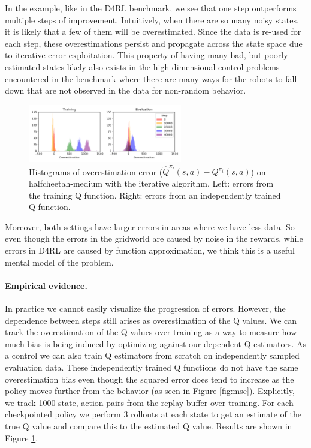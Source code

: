 In the example, like in the D4RL benchmark, we see that one step outperforms multiple steps of improvement. Intuitively, when there are so many noisy states, it is likely that a few of them will be overestimated. Since the data is re-used for each step, these overestimations persist and propagate across the state space due to iterative error exploitation. This property of having many bad, but poorly estimated states likely also exists in the high-dimensional control problems encountered in the benchmark where there are many ways for the robots to fall down that are not observed in the data for non-random behavior.
\begin{figure}[h]
\vspace{-0.5cm}
    \centering
    \includegraphics[width=0.6\textwidth]{figures/offline-rl/estimation/histograms.png}
    \caption{Histograms of overestimation error ($\widehat Q^{\pi_i}(s,a) - Q^{\pi_i}(s,a)$) on halfcheetah-medium with the iterative algorithm. Left: errors from the training Q function. Right: errors from an independently trained Q function.}
    \label{fig:over}
\end{figure}
Moreover, both settings have larger errors in areas where we have less data.
So even though the errors in the gridworld are caused by noise in the rewards, while errors in D4RL are caused by function approximation, we think this is a useful mental model of the problem.

\paragraph{Empirical evidence.}
In practice we cannot easily visualize the progression of errors. However, the dependence between steps still arises as overestimation of the Q values. We can track the overestimation of the Q values over training as a way to measure how much bias is being induced by optimizing against our dependent Q estimators. As a control we can also train Q estimators from scratch on independently sampled evaluation data. These independently trained Q functions do not have the same overestimation bias even though the squared error does tend to increase as the policy moves further from the behavior (as seen in Figure \ref{fig:mse}).
Explicitly, we track 1000 state, action pairs from the replay buffer over training. For each checkpointed policy we perform 3 rollouts at each state to get an estimate of the true Q value and compare this to the estimated Q value. Results are shown in Figure \ref{fig:over}.








